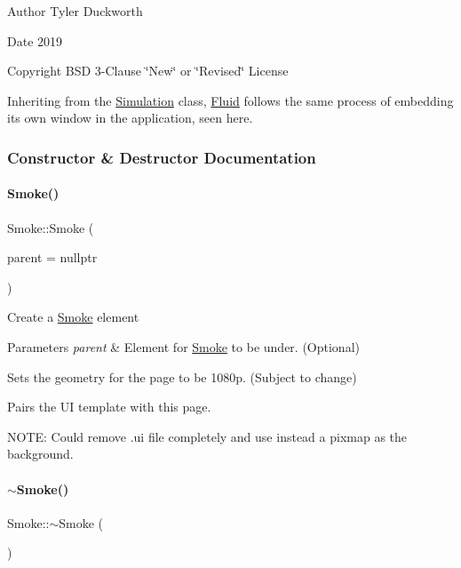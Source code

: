 \begin{DoxyAuthor}{Author}
Tyler Duckworth 
\end{DoxyAuthor}
\begin{DoxyDate}{Date}
2019 
\end{DoxyDate}
\begin{DoxyCopyright}{Copyright}
B\+SD 3-\/Clause \char`\"{}\+New\char`\"{} or \char`\"{}\+Revised\char`\"{} License
\end{DoxyCopyright}
Inheriting from the \mbox{\hyperlink{classSimulation}{Simulation}} class, \mbox{\hyperlink{classFluid}{Fluid}} follows the same process of embedding its own window in the application, seen here. 

\subsubsection{Constructor \& Destructor Documentation}
\mbox{\label{classSmoke_a37d4531eec55ecb9085bf7b1a6b03228}} 
\paragraph{\texorpdfstring{Smoke()}{Smoke()}}
{\footnotesize\ttfamily Smoke\+::\+Smoke (\begin{DoxyParamCaption}\item[{Q\+Widget $\ast$}]{parent = {\ttfamily nullptr} }\end{DoxyParamCaption})\hspace{0.3cm}{\ttfamily [explicit]}}

Create a \mbox{\hyperlink{classSmoke}{Smoke}} element 
\begin{DoxyParams}{Parameters}
{\em parent} & Element for \mbox{\hyperlink{classSmoke}{Smoke}} to be under. (Optional)\\
\hline
\end{DoxyParams}
Sets the geometry for the page to be 1080p. (Subject to change)

Pairs the UI template with this page.

N\+O\+TE\+: Could remove .ui file completely and use instead a pixmap as the background. \mbox{\label{classSmoke_a545ad6bf5610bf9bbe3e62967db1fff9}} 
\paragraph{\texorpdfstring{$\sim$Smoke()}{~Smoke()}}
{\footnotesize\ttfamily Smoke\+::$\sim$\+Smoke (\begin{DoxyParamCaption}{ }\end{DoxyParamCaption})}



